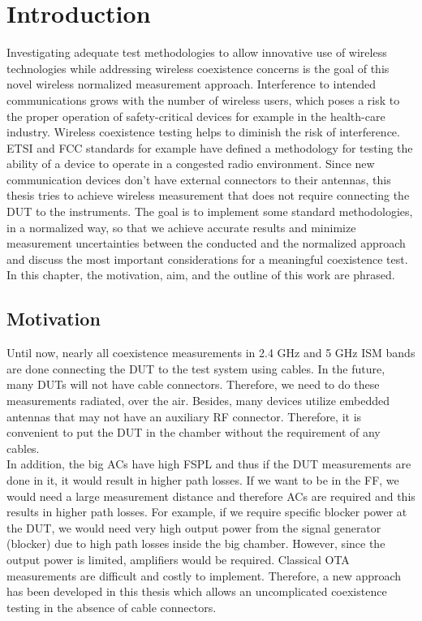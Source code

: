 \chapter{Introduction}
Investigating adequate test methodologies to allow innovative use of wireless technologies while addressing wireless coexistence concerns is the goal of this novel wireless normalized measurement approach. Interference to intended communications grows with the number of wireless users, which poses a risk to the proper operation of safety-critical devices for example in the health-care industry. Wireless coexistence testing helps to diminish the risk of interference. \acf{ETSI} and \acf{FCC} standards for example have defined a methodology for testing the ability of a device to operate in a congested radio environment. Since new communication devices don't have external connectors to their antennas, this thesis tries to achieve wireless measurement that does not require connecting the \acf{DUT} to the instruments. The goal is to implement some standard methodologies, in a normalized way, so that we achieve accurate results and minimize measurement uncertainties between the conducted and the normalized approach and discuss the most important considerations for a meaningful coexistence test. In this chapter, the motivation, aim, and the outline of this work are phrased.

\section{Motivation}
Until now, nearly all coexistence measurements in 2.4 GHz and 5 GHz \ac{ISM}  bands are done connecting the \acs{DUT} to the test system using cables. In the future, many \acsp{DUT} will not have cable connectors. Therefore, we need to do these measurements radiated, over the air. Besides, many devices utilize embedded antennas that may not have an auxiliary \acs{RF} connector. Therefore, it is convenient to put the \acs{DUT} in the chamber without the requirement of any cables. \\

In addition, the big  \acp{AC} have high \acf{FSPL} and thus if the \acs{DUT} measurements are done in it, it would result in higher path losses. If we want to be in the \acf{FF}, we would need a large measurement distance and therefore \acfp{AC} are required and this results in higher path losses. For example, if we require specific blocker power at the \acs{DUT}, we would need very high output power from the signal generator (blocker) due to high path losses inside the big chamber. However, since the output power is limited, amplifiers would be required. Classical \ac{OTA} measurements are difficult and costly to implement. Therefore, a new approach has been developed in this thesis which allows an uncomplicated coexistence testing in the absence of cable connectors. 


